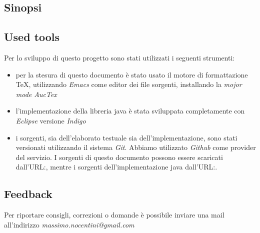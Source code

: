 \subsection{Sinopsi}

\subsection{Used tools}
Per lo sviluppo di questo progetto sono stati utilizzati i seguenti
strumenti:
\begin{itemize}
\item per la stesura di questo documento \`e stato usato il motore di
  formattazione \TeX, utilizzando \emph{Emacs} come editor dei file
  sorgenti, installando la \emph{mojor mode AucTex}
\item l'implementazione della libreria java \`e stata sviluppata
  completamente con \emph{Eclipse} versione \emph{Indigo}
\item i sorgenti, sia dell'elaborato testuale sia
  dell'implementazione, sono stati versionati utilizzando il sistema
  \emph{Git}. Abbiamo utilizzato \emph{Github} come provider del
  servizio. I sorgenti di questo documento possono essere scaricati
  dall'URL:, mentre i sorgenti dell'implementazione java
  dall'URL:.
\end{itemize}

\subsection{Feedback}
Per riportare consigli, correzioni o domande \`e possibile inviare una
mail all'indirizzo \emph{massimo.nocentini@gmail.com}